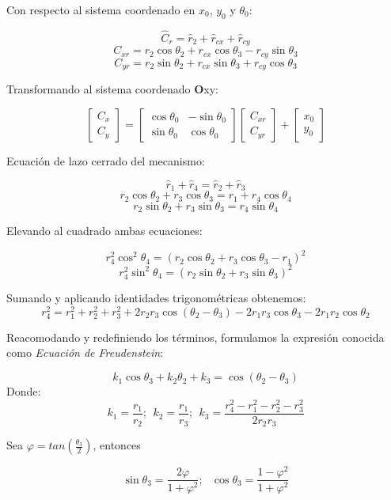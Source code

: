 \documentclass[10pt,journal,compsoc]{styles/IEEEtran}
\begin{document}
  
 Con respecto al sistema coordenado en $x_0$, $y_0$ y  $\theta_0$:
 
    $$\widehat{C}_r=\widehat{r}_2+\widehat{r}_{cx}+\widehat{r}_{cy}$$
    $$C_{xr}=r_2 \cos \theta_2 + r_{cx} \cos \theta_3 - r_{cy} \sin \theta_3$$
    $$C_{yr}=r_2 \sin \theta_2 + r_{cx} \sin \theta_3 + r_{cy} \cos \theta_3$$
    
Transformando al sistema coordenado \textbf{O}xy:

 	$$\begin{bmatrix}
 	C_x \\
 	C_y 
 	\end{bmatrix}=
 	\begin{bmatrix}
 	\cos \theta_0 & - \sin \theta_0 \\
 	\sin \theta_0 & \cos \theta_0
 	\end{bmatrix}
 	\begin{bmatrix}
 	C_{xr} \\
 	C_{yr} 
 	\end{bmatrix}+
 	\begin{bmatrix}
 	x_0 \\
 	y_0 
 	\end{bmatrix}$$

    Ecuación de lazo cerrado del mecanismo:
    
	$$\widehat{r}_1+\widehat{r}_4=\widehat{r}_2+\widehat{r}_3$$	
	$$r_2 \cos \theta_2 +r_3 \cos \theta_3=r_1 +r_4 \cos \theta_4$$
	$$r_2 \sin \theta_2 +r_3 \sin \theta_3=r_4 \sin \theta_4$$
	
	Elevando al cuadrado ambas ecuaciones:
	
	$$r_4^2 \cos^2 \theta_4=(r_2 \cos \theta_2 +r_3 \cos \theta_3-r_1)^2$$
	$$r_4^2 \sin^2 \theta_4=(r_2 \sin \theta_2 +r_3 \sin \theta_3)^2$$
	
	Sumando y aplicando identidades trigonométricas obtenemos:
 	$$r_4^2 = r_1^2 + r_2^2 + r_3^2 + 2r_2 r_3 \cos(\theta_2-\theta_3)- 2 r_1 r_3 \cos \theta_3 -2r_1 r_2 \cos \theta_2$$
  
	Reacomodando y redefiniendo los términos, formulamos la expresión conocida como \emph{Ecuación de Freudenstein}:
	
	$$k_1 \cos \theta_3 + k_2 \theta_2 + k_3 = \cos (\theta_2 - \theta_3)$$
	Donde:
	$$k_1=\frac{r_1}{r_2};~~ k_2=\frac{r_1}{r_3};~~ k_3=\frac{r_4^2-r_1^2 - r_2^2 - r_3^2}{2r_2 r_3}$$
	
Sea $\varphi=tan (\frac{\theta_3}{2})$, entonces
 
 $$\sin \theta_3 = \frac{2 \varphi}{1+\varphi^2};~~~ \cos \theta_3= \frac{1-\varphi^2}{1+\varphi^2}$$
 
\end{document}
